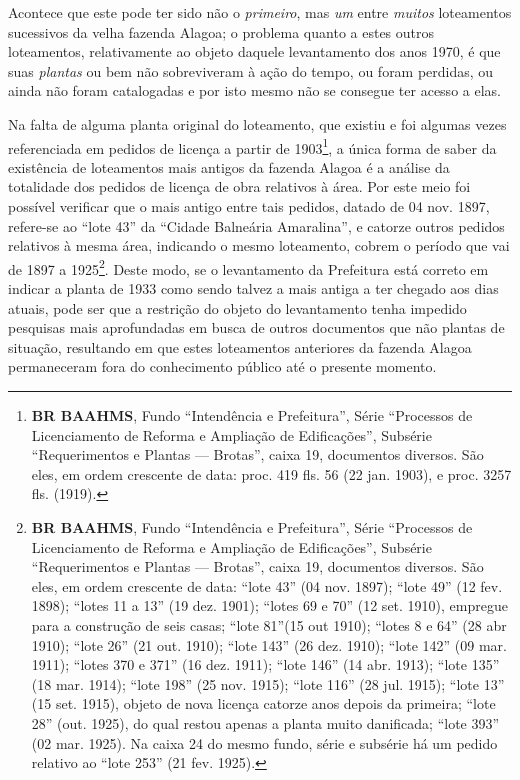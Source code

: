Acontece que este pode ter sido não o \textit{primeiro}, mas \textit{um} entre \textit{muitos} loteamentos sucessivos da velha fazenda Alagoa; o problema quanto a estes outros loteamentos, relativamente ao objeto daquele levantamento dos anos 1970, é que suas \textit{plantas} ou bem não sobreviveram à ação do tempo, ou foram perdidas, ou ainda não foram catalogadas e por isto mesmo não se consegue ter acesso a elas.

Na falta de alguma planta original do loteamento, que existiu e foi algumas vezes referenciada em pedidos de licença a partir de 1903\footnote{\textbf{BR BAAHMS}, Fundo ``Intendência e Prefeitura'', Série ``Processos de Licenciamento de Reforma e Ampliação de Edificações'', Subsérie ``Requerimentos e Plantas --- Brotas'', caixa 19, documentos diversos. São eles, em ordem crescente de data: proc. 419 fls. 56 (22 jan. 1903), e proc. 3257 fls. (1919).}, a única forma de saber da existência de loteamentos mais antigos da fazenda Alagoa é a análise da totalidade dos pedidos de licença de obra relativos à área. Por este meio foi possível verificar que o mais antigo entre tais pedidos, datado de 04 nov. 1897, refere-se ao ``lote 43'' da ``Cidade Balneária Amaralina'', e catorze outros pedidos relativos à mesma área, indicando o mesmo loteamento, cobrem o período que vai de 1897 a 1925\footnote{\textbf{BR BAAHMS}, Fundo ``Intendência e Prefeitura'', Série ``Processos de Licenciamento de Reforma e Ampliação de Edificações'', Subsérie ``Requerimentos e Plantas --- Brotas'', caixa 19, documentos diversos. São eles, em ordem crescente de data: ``lote 43'' (04 nov. 1897); ``lote 49'' (12 fev. 1898); ``lotes 11 a 13'' (19 dez. 1901); ``lotes 69 e 70'' (12 set. 1910), empregue para a construção de seis casas; ``lote 81''(15 out 1910); ``lotes 8 e 64'' (28 abr 1910); ``lote 26'' (21 out. 1910); ``lote 143'' (26 dez. 1910); ``lote 142'' (09 mar. 1911); ``lotes 370 e 371'' (16 dez. 1911); ``lote 146'' (14 abr. 1913); ``lote 135'' (18 mar. 1914); ``lote 198'' (25 nov. 1915); ``lote 116'' (28 jul. 1915); ``lote 13'' (15 set. 1915), objeto de nova licença catorze anos depois da primeira; ``lote 28'' (out. 1925), do qual restou apenas a planta muito danificada; ``lote 393'' (02 mar. 1925). Na caixa 24 do mesmo fundo, série e subsérie há um pedido relativo ao ``lote 253'' (21 fev. 1925).}. Deste modo, se o levantamento da Prefeitura está correto em indicar a planta de 1933 como sendo talvez a mais antiga a ter chegado aos dias atuais, pode ser que a restrição do objeto do levantamento tenha impedido pesquisas mais aprofundadas em busca de outros documentos que não plantas de situação, resultando em que estes loteamentos anteriores da fazenda Alagoa permaneceram fora do conhecimento público até o presente momento.

